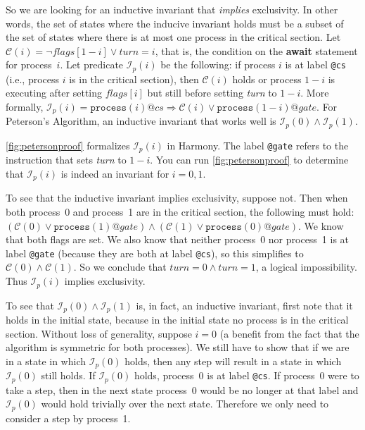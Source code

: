 \documentclass{report}
\begin{document}
So we are looking for an inductive invariant that \emph{implies} exclusivity.
In other words, the set of states where the inducive invariant holds
must be a subset of the set of states where there is at most one process in
the critical section.
Let $\mathcal{C}(i) = \lnot\mathit{flags}[1 - i] \lor
\mathit{turn} = i$, that is, the condition on the \textbf{await}
statement for process~$i$.
Let predicate $\mathcal{I}_p(i)$ be the following:
if process $i$ is at label \texttt{@cs} (i.e., process $i$ is in the critical section),
then $\mathcal{C}(i)$ holds or process $1-i$ is executing after setting
$\mathit{flags}[i]$ but still before setting \textit{turn} to $1-i$.
More formally, $\mathcal{I}_p(i) = \mathtt{process}(i)@cs \Rightarrow \mathcal{C}(i) \lor \mathtt{process}(1-i)@gate$.
For Peterson's Algorithm, an inductive invariant that works well is
$\mathcal{I}_p(0) \land \mathcal{I}_p(1)$.

\autoref{fig:petersonproof} formalizes $\mathcal{I}_p(i)$ in Harmony.
The label \texttt{@gate} refers to the instruction that sets \textit{turn} to $1-i$.
You can run \autoref{fig:petersonproof} to determine
that $\mathcal{I}_p(i)$ is indeed an invariant for $i = 0, 1$.

To see that the inductive invariant implies exclusivity, suppose not.  Then
when both process~0 and process~1 are in the critical section, the
following must hold:
$(\mathcal{C}(0) \lor \mathtt{process}(1)@gate) \land
 (\mathcal{C}(1) \lor \mathtt{process}(0)@gate)$.
We know that both flags are set.
We also know that neither process~0 nor process~1 is at label \texttt{@gate}
(because they are both at label \texttt{@cs}),
so this simplifies to $\mathcal{C}(0) \land \mathcal{C}(1)$.
So we conclude that $\mathit{turn} = 0 \land \mathit{turn} = 1$, a
logical impossibility.  Thus $\mathcal{I}_p(i)$ implies exclusivity.

To see that $\mathcal{I}_p(0) \land \mathcal{I}_p(1)$ is, in fact, an inductive invariant, first note that
it holds in the initial state, because in the initial state no process
is in the critical section.
Without loss of generality, suppose $i=0$ (a benefit from the fact that the algorithm is
symmetric for both processes).  We still have to show that if we are in a state
in which $\mathcal{I}_p(0)$ holds, then any step will result in a state in which
$\mathcal{I}_p(0)$ still holds.
If $\mathcal{I}_p(0)$ holds, process~0 is at label \texttt{@cs}.  If process~0
were to take a step, then in the next state process~0 would be no longer
at that label and $\mathcal{I}_p(0)$ would hold trivially over the next state.
Therefore we only need to consider a step by process~1.
\end{document}
